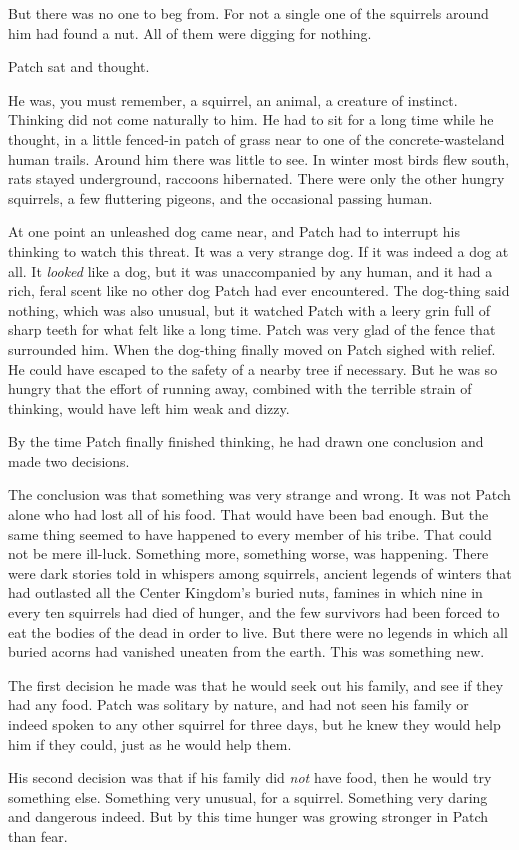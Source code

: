 \documentclass[12pt]{book}
\begin{document}
But there was no one to beg from. For not a single one of the squirrels around him had found a nut. All of them were digging for nothing.\par
 Patch sat and thought.\par
He was, you must remember, a squirrel, an animal, a creature of instinct. Thinking did not come naturally to him. He had to sit for a long time while he thought, in a little fenced-in patch of grass near to one of the concrete-wasteland human trails. Around him there was little to see. In winter most birds flew south, rats stayed underground, raccoons hibernated. There were only the other hungry squirrels, a few fluttering pigeons, and the occasional passing human.\par
At one point an unleashed dog came near, and Patch had to interrupt his thinking to watch this threat. It was a very strange dog. If it was indeed a dog at all. It {\it looked} like a dog, but it was unaccompanied by any human, and it had a rich, feral scent like no other dog Patch had ever encountered. The dog-thing said nothing, which was also unusual, but it watched Patch with a leery grin full of sharp teeth for what felt like a long time. Patch was very glad of the fence that surrounded him. When the dog-thing finally moved on Patch sighed with relief. He could have escaped to the safety of a nearby tree if necessary. But he was so hungry that the effort of running away, combined with the terrible strain of thinking, would have left him weak and dizzy.\par
By the time Patch finally finished thinking, he had drawn one conclusion and made two decisions.\par
 The conclusion was that something was very strange and wrong. It was not Patch alone who had lost all of his food. That would have been bad enough. But the same thing seemed to have happened to every member of his tribe. That could not be mere ill-luck. Something more, something worse, was happening. There were dark stories told in whispers among squirrels, ancient legends of winters that had outlasted all the Center Kingdom's buried nuts, famines in which nine in every ten squirrels had died of hunger, and the few survivors had been forced to eat the bodies of the dead in order to live. But there were no legends in which all buried acorns had vanished uneaten from the earth. This was something new.\par
The first decision he made was that he would seek out his family, and see if they had any food. Patch was solitary by nature, and had not seen his family or indeed spoken to any other squirrel for three days, but he knew they would help him if they could, just as he would help them.\par
His second decision was that if his family did {\it not} have food, then %
 he would try something else. Something very unusual, for a squirrel. Something very daring and dangerous indeed. But by this time hunger was growing stronger in Patch than fear.\par
\end{document}
